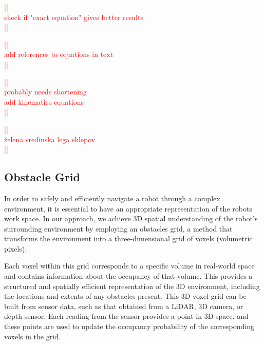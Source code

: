\documentclass[a4paper]{article}
\newcommand\todocomment[1]{\textcolor{red}{||\\ #1\\||}}
\begin{document}
\todocomment{check if "exact equation" gives better results}


\todocomment{add references to equations in text}

\todocomment{probably needs shortening \\
			 add kinematics equations}
		 
\todocomment{želena sredinska lega sklepov}


\subsection{Obstacle Grid}

In order to safely and efficiently navigate a robot through a complex environment, it is essential to have an appropriate representation of the robots work space. In our approach, we achieve 3D spatial understanding of the robot's surrounding environment by employing an obstacles grid, a method that transforms the environment into a three-dimensional grid of voxels (volumetric pixels).

Each voxel within this grid corresponds to a specific volume in real-world space and contains information about the occupancy of that volume. This provides a structured and spatially efficient representation of the 3D environment, including the locations and extents of any obstacles present. This 3D voxel grid can be built from sensor data, such as that obtained from a LiDAR, 3D camera, or depth sensor. Each reading from the sensor provides a point in 3D space, and these points are used to update the occupancy probability of the corresponding voxels in the grid.



%
%
\end{document}
